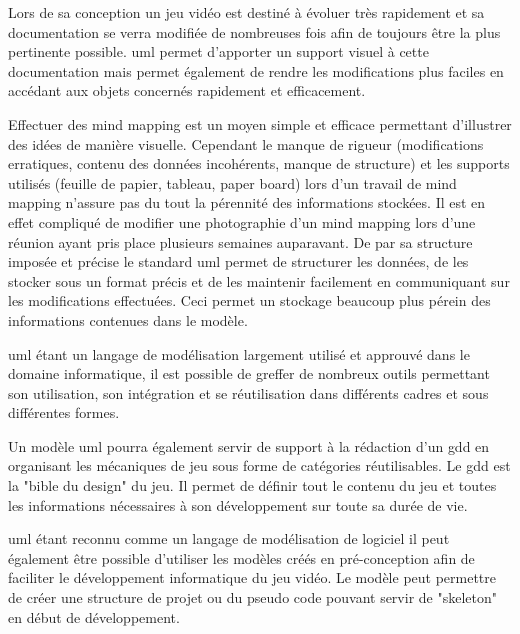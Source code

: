 Lors de sa conception un jeu vidéo est destiné à évoluer très rapidement et sa documentation se verra modifiée de nombreuses fois afin de toujours être la plus pertinente possible. \gls{uml} permet d'apporter un support visuel à cette documentation mais permet également de rendre les modifications plus faciles en accédant aux objets concernés rapidement et efficacement. 

Effectuer des mind mapping est un moyen simple et efficace permettant d'illustrer des idées de manière visuelle. Cependant le manque de rigueur (modifications erratiques, contenu des données incohérents, manque de structure) et les supports utilisés (feuille de papier, tableau, paper board) lors d'un travail de mind mapping n'assure pas du tout la pérennité des informations stockées. Il est en effet compliqué de modifier une photographie d'un mind mapping lors d'une réunion ayant pris place plusieurs semaines auparavant. De par sa structure imposée et précise le standard \gls{uml} permet de structurer les données, de les stocker sous un format précis et de les maintenir facilement en communiquant sur les modifications effectuées. Ceci permet un stockage beaucoup plus pérein des informations contenues dans le modèle.

\gls{uml} étant un langage de modélisation largement utilisé et approuvé dans le domaine informatique, il est possible de greffer de nombreux outils permettant son utilisation, son intégration et se réutilisation dans différents cadres et sous différentes formes.

Un modèle \gls{uml} pourra également servir de support à la rédaction d'un \gls{gdd} en organisant les mécaniques de jeu sous forme de catégories réutilisables. Le \gls{gdd} est la "bible du design" \cite{GD_foundations_pedersen} du jeu. Il permet de définir tout le contenu du jeu et toutes les informations nécessaires à son développement sur toute sa durée de vie. 

\gls{uml} étant reconnu comme un langage de modélisation de logiciel il peut également être possible d'utiliser les modèles créés en pré-conception afin de faciliter le développement informatique du jeu vidéo. Le modèle peut permettre de créer une structure de projet ou du pseudo code pouvant servir de "skeleton" en début de développement.



